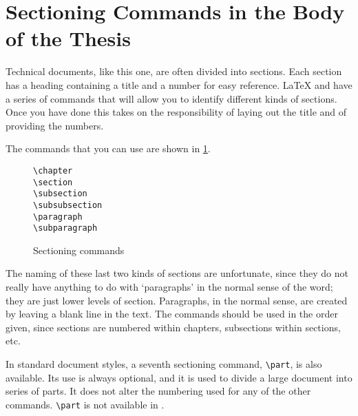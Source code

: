 \section{Sectioning Commands in the Body of the Thesis}
\label{sec:section}
Technical documents, like this one, are often divided into sections.
Each section has a heading containing a title and a number for easy
reference.
\LaTeX{} and \uicthesi{} have a series of commands that will allow you
to identify different kinds of sections.
Once you have done this \uicthesi{} takes on the
responsibility of laying out the title and of providing the numbers.
 
The commands that you can use are shown in \ref{fig:sections}.
\begin{figure}
\centering
\verb+\chapter+\\
\verb+\section+\\
\verb+\subsection+\\
\verb+\subsubsection+\\
\verb+\paragraph+\\
\verb+\subparagraph+
\caption{Sectioning commands}\label{fig:sections}
\end{figure}
The naming of these last two kinds of sections are
unfortunate, since they do not really have anything to do with
`paragraphs' in the normal sense of the word; they are just
lower levels of section.
Paragraphs, in the normal sense, are created by leaving a blank line
in the text.
The commands should be used in the order given, since sections are
numbered within chapters, subsections within sections, etc.
 
In standard document styles,
a seventh sectioning command, \verb|\part|, is also available.
Its use is always optional, and it is used to divide a large document
into series of parts.
It does not alter the numbering used for any of the other commands.
\verb|\part| is not available in \uicthesi{}.
 
